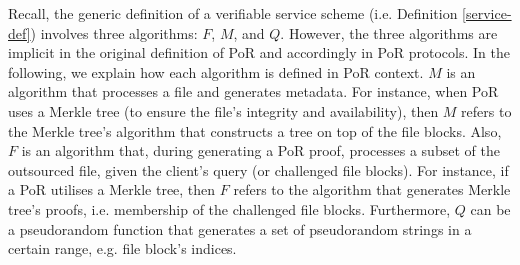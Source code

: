    \begin{remark}
   Recall,  the generic definition of a verifiable service scheme (i.e. Definition \ref{service-def}) involves three algorithms: $F$, $M$, and $Q$. However, the three algorithms are implicit in the original definition of  PoR and accordingly in  PoR protocols. In the following, we explain how each algorithm is defined in PoR context.  $M$ is an algorithm that processes a file and generates metadata. For instance, when PoR uses a Merkle tree (to ensure the file's integrity and availability), then $M$ refers to the Merkle tree's algorithm that constructs a tree on top of the file blocks. Also,  $F$ is an algorithm that, during generating a PoR proof, processes a subset of the outsourced file, given the client's query (or challenged file blocks). For instance, if a PoR  utilises a Merkle tree, then $F$ refers to the algorithm that generates Merkle tree's proofs, i.e.  membership of the challenged file blocks. Furthermore, $Q$ can be  a pseudorandom function that generates a set of pseudorandom strings in a certain range, e.g. file block's indices.   
   \end{remark}

